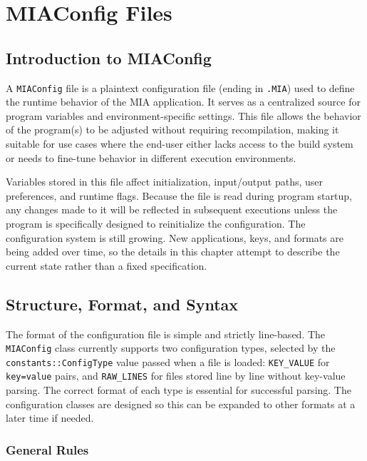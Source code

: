 \chapter{MIAConfig Files} \label{chap:MIAConfig}
\pagestyle{fancy}

\lstset{language=Python}

\section{Introduction to MIAConfig}

A \texttt{MIAConfig} file is a plaintext configuration file (ending in \texttt{.MIA}) used to define the runtime behavior of the MIA application. It serves as a centralized source for program variables and environment-specific settings. This file allows the behavior of the program(s) to be adjusted without requiring recompilation, making it suitable for use cases where the end-user either lacks access to the build system or needs to fine-tune behavior in different execution environments.

Variables stored in this file affect initialization, input/output paths, user preferences, and runtime flags. Because the file is read during program startup, any changes made to it will be reflected in subsequent executions unless the program is specifically designed to reinitialize the configuration. The configuration system is still growing. New applications, keys, and formats are being added over time, so the details in this chapter attempt to describe the current state rather than a fixed specification.

\section{Structure, Format, and Syntax}

The format of the configuration file is simple and strictly line-based. The \texttt{MIAConfig} class currently supports two configuration types, selected by the \texttt{constants::ConfigType} value passed when a file is loaded: \texttt{KEY\_VALUE} for \texttt{key=value} pairs, and \texttt{RAW\_LINES} for files stored line by line without key-value parsing. The correct format of each type is essential for successful parsing. The configuration classes are designed so this can be expanded to other formats at a later time if needed.

\subsection*{General Rules}

